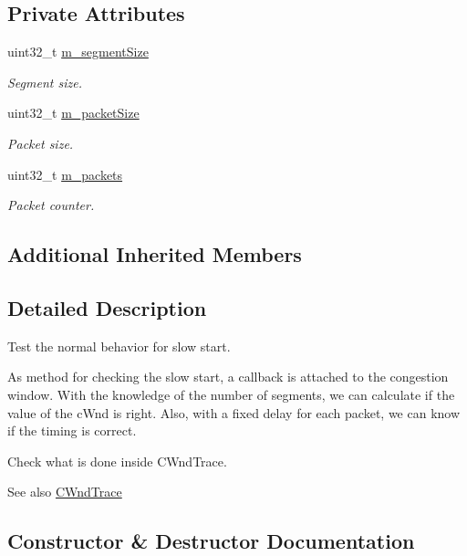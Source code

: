 \subsection*{Private Attributes}
\begin{DoxyCompactItemize}
\item 
uint32\+\_\+t \hyperlink{classTcpSlowStartNormalTest_a9ee594f2cab933a6e4bfb429da1ec53f}{m\+\_\+segment\+Size}
\begin{DoxyCompactList}\small\item\em Segment size. \end{DoxyCompactList}\item 
uint32\+\_\+t \hyperlink{classTcpSlowStartNormalTest_a2784d554fee242ca15747e7e9bd0c361}{m\+\_\+packet\+Size}
\begin{DoxyCompactList}\small\item\em Packet size. \end{DoxyCompactList}\item 
uint32\+\_\+t \hyperlink{classTcpSlowStartNormalTest_a42642a5ac7d4c64d185f4cb96d53d68e}{m\+\_\+packets}
\begin{DoxyCompactList}\small\item\em Packet counter. \end{DoxyCompactList}\end{DoxyCompactItemize}
\subsection*{Additional Inherited Members}


\subsection{Detailed Description}
Test the normal behavior for slow start. 

As method for checking the slow start, a callback is attached to the congestion window. With the knowledge of the number of segments, we can calculate if the value of the c\+Wnd is right. Also, with a fixed delay for each packet, we can know if the timing is correct.

Check what is done inside C\+Wnd\+Trace.

\begin{DoxySeeAlso}{See also}
\hyperlink{classTcpSlowStartNormalTest_afb8a38b1e691a4aedd12c6e6b40e0bd9}{C\+Wnd\+Trace} 
\end{DoxySeeAlso}


\subsection{Constructor \& Destructor Documentation}
